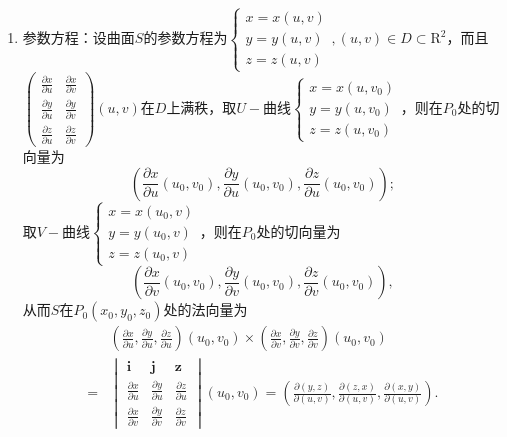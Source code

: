 \documentclass[UTF8]{ctexart}
\newcommand{\p}[2]{\frac{\partial #1}{\partial #2}}
\begin{document}
\begin{enumerate}[(1)]
        \item 参数方程：设曲面$S$的参数方程为$\begin{cases}
            x=x(u,v)\\
            y=y(u,v)\\
            z=z(u,v)
        \end{cases},(u,v)\in D\subset\mathrm{R}^2$，而且$\begin{pmatrix}
            \p{x}{u}&\p{x}{v}\\
            \p{y}{u}&\p{y}{v}\\
            \p{z}{u}&\p{z}{v}
        \end{pmatrix}(u,v)$在$D$上满秩，取$U-$曲线$\begin{cases}
            x=x(u,v_0)\\
            y=y(u,v_0)\\
            z=z(u,v_0)
        \end{cases}$，则在$P_0$处的切向量为$$\left(\p{x}{u}(u_0,v_0),\p{y}{u}(u_0,v_0),\p{z}{u}(u_0,v_0)\right);$$取$V-$曲线$\begin{cases}
            x=x(u_0,v)\\
            y=y(u_0,v)\\
            z=z(u_0,v)
        \end{cases}$，则在$P_0$处的切向量为$$\left(\p{x}{v}(u_0,v_0),\p{y}{v}(u_0,v_0),\p{z}{v}(u_0,v_0)\right),$$从而$S$在$P_0(x_0,y_0,z_0)$处的法向量为\begin{align*}
            &\left(\p{x}{u},\p{y}{u},\p{z}{u}\right)(u_0,v_0)\times\left(\p{x}{v},\p{y}{v},\p{z}{v}\right)(u_0,v_0)\\
            =&\begin{vmatrix}
                \boldsymbol{i}&\boldsymbol{j}&\boldsymbol{z}\\
                \p{x}{u}&\p{y}{u}&\p{z}{u}\\
                \p{x}{v}&\p{y}{v}&\p{z}{v}
            \end{vmatrix}(u_0,v_0)=\left(\p{(y,z)}{(u,v)},\p{(z,x)}{(u,v)},\p{(x,y)}{(u,v)}\right).
        \end{align*}


\end{enumerate}
\end{document}
